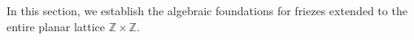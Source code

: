 \documentclass[11pt]{amsart}
\theoremstyle{plain}
\theoremstyle{definition}
\newtheorem{definition}[proposition]{Definition}
\theoremstyle{remark}
\begin{document}

In this section, we establish the algebraic foundations for friezes extended to
the entire planar lattice $\mathbb{Z} \times \mathbb{Z}$.

\end{document}
